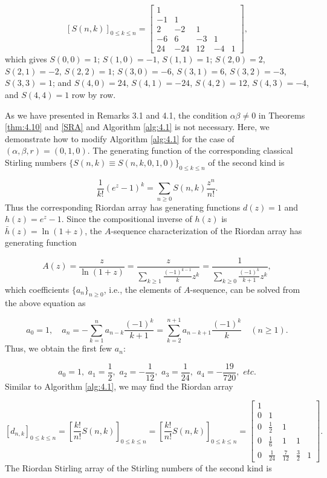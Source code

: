 \[
\left[ S(n,k)\right]_{0\leq k\leq n}=\left[\begin{array}{rrrrr} 1 &  & & &  \\
-1 &1 & & & \\ 2 &-2& 1& &  \\ -6 & 6& -3 &1 & \\ 24 & -24& 12& -4& 1\end{array}\right],
\]
which gives $S(0,0)=1$; $S(1,0)=-1$, $S(1,1)=1$; $S(2,0)=2$, $S(2,1)=-2$, $S(2,2)=1$; $S(3,0)=-6$, $ S(3,1)=6$, $S(3,2)=-3$, $S(3,3)=1$; and $S(4,0)=24$, $S(4,1)=-24$, $S(4,2)=12$, $S(4,3)=-4$, and $S(4,4)=1$ row by row.
\medbreak

 As we have presented in Remarks 3.1 and 4.1, the condition $\alpha\beta \not= 0$ in Theorems \ref{thm:4.10} and \ref{SRA} and Algorithm \ref{alg:4.1} is not necessary. Here, we demonstrate how to modify Algorithm \ref{alg:4.1} for the case of $(\alpha, \beta ,r) =(0,1,0)$. The generating function of the corresponding classical Stirling numbers $\{ S(n,k)\equiv S(n,k,0,1,0)\}_{0\leq k\leq n}$ of the second kind is

\[
\frac{1}{k!} (e^z-1)^k =\sum_{n\geq 0} S( n,k)\frac{z^n}{n!}.
\]
Thus the corresponding Riordan array has generating functions $d(z)=1$ and $h(z)=e^z-1$. Since the compositional inverse of $h(z)$ is $\bar h(z)=\ln (1+z)$, the $A$-sequence characterization of the Riordan array has generating function

\[
A(z)=\frac{z}{\ln (1+z)}=\frac{z}{\sum_{k\geq 1} \frac{(-1)^{k-1}}{k} z^k}=\frac{1}{\sum_{k\geq 0} \frac{(-1)^k}{k+1} z^k},
\]
which coefficients $\{ a_n\}_{n\geq 0}$, i.e., the elements of $A$-sequence, can be solved from the above equation as

\[
a_0=1, \quad a_n=-\sum^n_{k=1} a_{n-k} \frac{(-1)^k}{k+1}=\sum^{n+1}_{k=2} a_{n-k+1}\frac{(-1)^k}{k}\quad (n\geq 1).
\]
Thus, we obtain the first few $a_n$:

\[
a_0=1, \,\, a_1=\frac{1}{2}, \,\, a_2=-\frac{1}{12},\,\, a_3=\frac{1}{24},\,\, a_4=-\frac{19}{720}, \,\, etc.
\]
Similar to Algorithm \ref{alg:4.1}, we may find the Riordan array

\[
[d_{n,k}]_{0\leq k\leq n}=\left[ \frac{k!}{n!} S(n,k)\right]_{0\leq k\leq n}=\left[ \frac{k!}{n!} S(n,k)\right]_{0\leq k\leq n}=\left[ \begin{array}{rrrrr} 1 &  & & &  \\
0 &1 & & & \\ 0 &\frac{1}{2}& 1& &  \\0 & \frac{1}{6}& 1 &1 & \\ 0 & \frac{1}{24}& \frac{7}{12}& \frac{3}{2}& 1\end{array}\right].
\]
The Riordan Stirling array of the Stirling numbers of the second kind is

